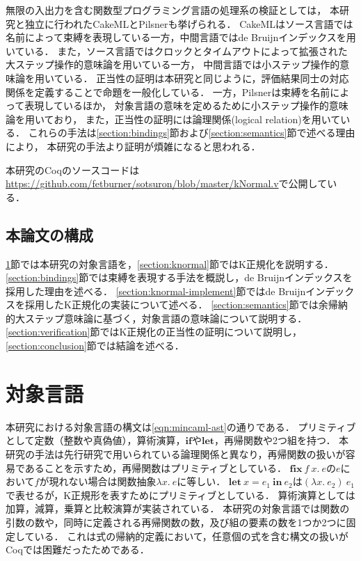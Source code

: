 \documentclass{compsoft}
\newcommand{\keyword}[1]{\mathbf{#1}}
\newcommand{\IF}{\keyword{if}}
\newcommand{\LET}{\keyword{let}}
\newcommand{\FIX}{\keyword{fix}}
\newcommand{\IN}{\keyword{in}}
\begin{document}
無限の入出力を含む関数型プログラミング言語の処理系の検証としては，
本研究と独立に行われたCakeML\cite{CakeML:ICFP16}とPilsner\cite{DBLP:conf/icfp/NeisHKMDV15}も挙げられる．
CakeMLはソース言語では名前によって束縛を表現している一方，中間言語ではde Bruijnインデックスを用いている．
また，ソース言語ではクロックとタイムアウトによって拡張された大ステップ操作的意味論を用いている一方，
中間言語では小ステップ操作的意味論を用いている．
正当性の証明は本研究と同じように，評価結果同士の対応関係を定義することで命題を一般化している．
一方，Pilsnerは束縛を名前によって表現しているほか，
対象言語の意味を定めるために小ステップ操作的意味論を用いており，
また，正当性の証明には論理関係(logical relation)を用いている．
これらの手法は\ref{section:bindings}節および\ref{section:semantics}節で述べる理由により，
本研究の手法より証明が煩雑になると思われる．

本研究のCoqのソースコードは\url{https://github.com/fetburner/sotsuron/blob/master/kNormal.v}で公開している．

\subsection{本論文の構成}
\ref{section:target}節では本研究の対象言語を，\ref{section:knormal}節ではK正規化を説明する．
\ref{section:bindings}節では束縛を表現する手法を概説し，de Bruijnインデックスを採用した理由を述べる．
\ref{section:knormal-implement}節ではde Bruijnインデックスを採用したK正規化の実装について述べる．
\ref{section:semantics}節では余帰納的大ステップ意味論に基づく，対象言語の意味論について説明する．
\ref{section:verification}節ではK正規化の正当性の証明について説明し，
\ref{section:conclusion}節では結論を述べる．

\section{対象言語}\label{section:target}
本研究における対象言語の構文は\figurename\ref{eqn:mincaml-ast}の通りである．
プリミティブとして定数（整数や真偽値），算術演算，$\IF$や$\LET$，再帰関数や2つ組を持つ．
本研究の手法は先行研究で用いられている論理関係と異なり，再帰関数の扱いが容易であることを示すため，再帰関数はプリミティブとしている．
$\FIX~f~x.~e$の$e$において$f$が現れない場合は関数抽象$\lambda x.~e$に等しい．
$\LET~x=e_1~\IN~e_2$は$(\lambda x.~e_2)~e_1$で表せるが，K正規形を表すためにプリミティブとしている．
算術演算としては加算，減算，乗算と比較演算が実装されている．
本研究の対象言語では関数の引数の数や，同時に定義される再帰関数の数，及び組の要素の数を1つか2つに固定している．
これは式の帰納的定義において，任意個の式を含む構文の扱いがCoqでは困難だったためである．
\end{document}
